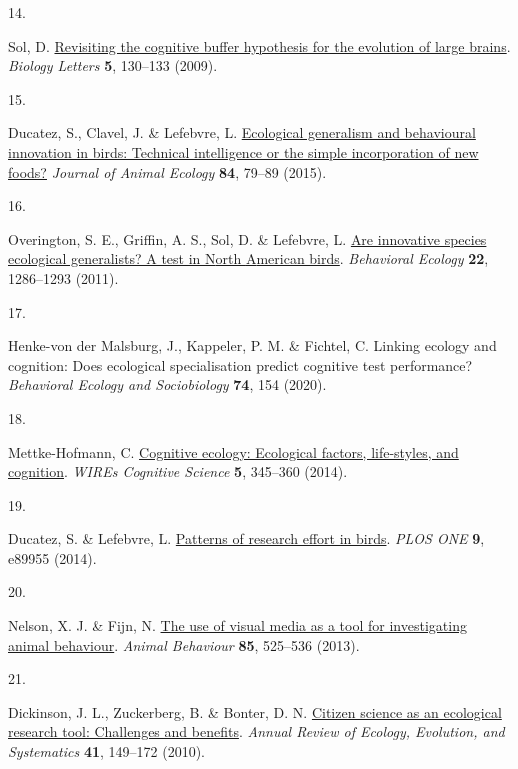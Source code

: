 \documentclass[
  man,floatsintext]{apa6}
\newlength{\cslhangindent}
\newlength{\csllabelwidth}
\newlength{\cslentryspacingunit} %
\newenvironment{CSLReferences}[2] %
 {%
  \setlength{\parindent}{0pt}
  \ifodd #1
  \let\oldpar\par
  \def\par{\hangindent=\cslhangindent\oldpar}
  \fi
  \setlength{\parskip}{#2\cslentryspacingunit}
 }%
 {}
\newcommand{\CSLLeftMargin}[1]{\parbox[t]{\csllabelwidth}{#1}}
\newcommand{\CSLRightInline}[1]{\parbox[t]{\linewidth - \csllabelwidth}{#1}\break}
\begin{document}
\begin{CSLReferences}{0}{0}
\leavevmode{}%
\CSLLeftMargin{14. }%
\CSLRightInline{Sol, D. \href{https://doi.org/10.1098/rsbl.2008.0621}{Revisiting the cognitive buffer hypothesis for the evolution of large brains}. \emph{Biology Letters} \textbf{5}, 130--133 (2009).}

\leavevmode{}%
\CSLLeftMargin{15. }%
\CSLRightInline{Ducatez, S., Clavel, J. \& Lefebvre, L. \href{https://doi.org/10.1111/1365-2656.12255}{Ecological generalism and behavioural innovation in birds: Technical intelligence or the simple incorporation of new foods?} \emph{Journal of Animal Ecology} \textbf{84}, 79--89 (2015).}

\leavevmode{}%
\CSLLeftMargin{16. }%
\CSLRightInline{Overington, S. E., Griffin, A. S., Sol, D. \& Lefebvre, L. \href{https://doi.org/10.1093/beheco/arr130}{Are innovative species ecological generalists? A test in {N}orth {A}merican birds}. \emph{Behavioral Ecology} \textbf{22}, 1286--1293 (2011).}

\leavevmode{}%
\CSLLeftMargin{17. }%
\CSLRightInline{Henke-von der Malsburg, J., Kappeler, P. M. \& Fichtel, C. Linking ecology and cognition: Does ecological specialisation predict cognitive test performance? \emph{Behavioral Ecology and Sociobiology} \textbf{74}, 154 (2020).}

\leavevmode{}%
\CSLLeftMargin{18. }%
\CSLRightInline{Mettke-Hofmann, C. \href{https://doi.org/10.1002/wcs.1289}{Cognitive ecology: Ecological factors, life-styles, and cognition}. \emph{WIREs Cognitive Science} \textbf{5}, 345--360 (2014).}

\leavevmode{}%
\CSLLeftMargin{19. }%
\CSLRightInline{Ducatez, S. \& Lefebvre, L. \href{https://doi.org/10.1371/journal.pone.0089955}{Patterns of research effort in birds}. \emph{PLOS ONE} \textbf{9}, e89955 (2014).}

\leavevmode{}%
\CSLLeftMargin{20. }%
\CSLRightInline{Nelson, X. J. \& Fijn, N. \href{https://doi.org/10.1016/j.anbehav.2012.12.009}{The use of visual media as a tool for investigating animal behaviour}. \emph{Animal Behaviour} \textbf{85}, 525--536 (2013).}

\leavevmode{}%
\CSLLeftMargin{21. }%
\CSLRightInline{Dickinson, J. L., Zuckerberg, B. \& Bonter, D. N. \href{https://doi.org/10.1146/annurev-ecolsys-102209-144636}{Citizen science as an ecological research tool: Challenges and benefits}. \emph{Annual Review of Ecology, Evolution, and Systematics} \textbf{41}, 149--172 (2010).}


\end{CSLReferences}
\end{document}
